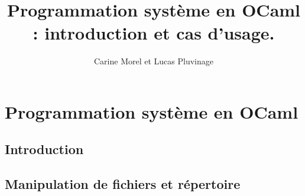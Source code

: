 \documentclass[xcolor=x11names]{beamer}
\title[Programmation système en OCaml]{Programmation système en OCaml : introduction et cas d'usage.}
\author[Carine et Lucas]{Carine Morel et Lucas Pluvinage}
\institute{Tarides}
\begin{document}
\maketitle


\section{Programmation système en OCaml}

\subsection{Introduction}


\subsection{Manipulation de fichiers et répertoire}









\end{document}
